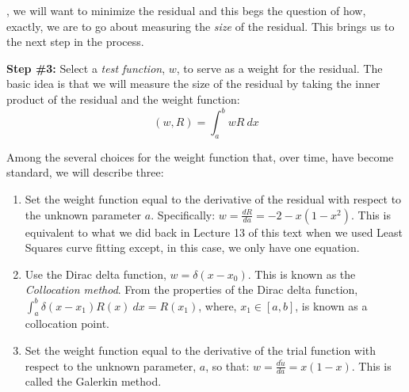 , we will want to minimize the residual and this begs the question of how, exactly, we are to go about measuring the \emph{size} of the residual.  This brings us to the next step in the process.


\vspace{0.25cm}

\noindent\textbf{Step \#3:} Select a \emph{test function}, $w$, to serve as a weight for the residual.  The basic idea is that we will measure the size of the residual by taking the inner product of the residual and the weight function:
\begin{equation*}
\left(w,R\right) = \int_{a}^{b} wR\ dx
\end{equation*}

Among the several choices for the weight function that, over time, have become standard, we will describe three:
\begin{enumerate}
\item Set the weight function equal to the derivative of the residual with respect to the unknown parameter $a$.  Specifically: $w=\frac{dR}{da} = -2 - x(1-x^2)$.  This is equivalent to what we did back in Lecture 13 of this text when we used Least Squares curve fitting except, in this case, we only have one equation.

\item Use the Dirac delta function, $w = \delta(x-x_0)$.  This is known as the \emph{Collocation method}.  From the properties of the Dirac delta function, $\int_{a}^{b} \delta{(x-x_1)}R(x) \ dx = R(x_1)$, where, $x_1 \in [a,b]$, is known as a collocation point.   

\item Set the weight function equal to the derivative of the trial function with respect to the unknown parameter, $a$, so that: $w = \frac{d\tilde{u}}{da} = x(1-x)$. This is called the Galerkin method.
\end{enumerate}

